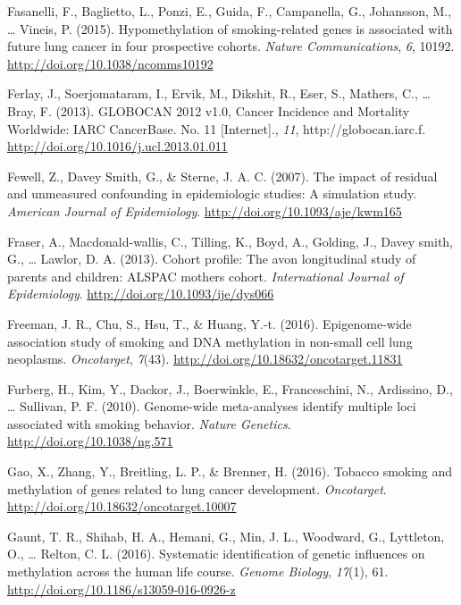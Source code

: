 \documentclass[11pt,twoside]{bristolthesis}
\newlength{\cslhangindent}
\newenvironment{cslreferences}%
  {\setlength{\parindent}{0pt}%
  \everypar{\setlength{\hangindent}{\cslhangindent}}\ignorespaces}%
  {\par}
\begin{document}
\begin{cslreferences}
\leavevmode\hypertarget{ref-Fasanelli2015}{}%
Fasanelli, F., Baglietto, L., Ponzi, E., Guida, F., Campanella, G., Johansson, M., \ldots{} Vineis, P. (2015). Hypomethylation of smoking-related genes is associated with future lung cancer in four prospective cohorts. \emph{Nature Communications}, \emph{6}, 10192. \url{http://doi.org/10.1038/ncomms10192}

\leavevmode\hypertarget{ref-Ferlay2013}{}%
Ferlay, J., Soerjomataram, I., Ervik, M., Dikshit, R., Eser, S., Mathers, C., \ldots{} Bray, F. (2013). GLOBOCAN 2012 v1.0, Cancer Incidence and Mortality Worldwide: IARC CancerBase. No. 11 {[}Internet{]}., \emph{11}, http://globocan.iarc.f. \url{http://doi.org/10.1016/j.ucl.2013.01.011}

\leavevmode\hypertarget{ref-Fewell2007}{}%
Fewell, Z., Davey Smith, G., \& Sterne, J. A. C. (2007). The impact of residual and unmeasured confounding in epidemiologic studies: A simulation study. \emph{American Journal of Epidemiology}. \url{http://doi.org/10.1093/aje/kwm165}

\leavevmode\hypertarget{ref-Fraser2013}{}%
Fraser, A., Macdonald-wallis, C., Tilling, K., Boyd, A., Golding, J., Davey smith, G., \ldots{} Lawlor, D. A. (2013). Cohort profile: The avon longitudinal study of parents and children: ALSPAC mothers cohort. \emph{International Journal of Epidemiology}. \url{http://doi.org/10.1093/ije/dys066}

\leavevmode\hypertarget{ref-Freeman2016}{}%
Freeman, J. R., Chu, S., Hsu, T., \& Huang, Y.-t. (2016). Epigenome-wide association study of smoking and DNA methylation in non-small cell lung neoplasms. \emph{Oncotarget}, \emph{7}(43). \url{http://doi.org/10.18632/oncotarget.11831}

\leavevmode\hypertarget{ref-Furberg2010}{}%
Furberg, H., Kim, Y., Dackor, J., Boerwinkle, E., Franceschini, N., Ardissino, D., \ldots{} Sullivan, P. F. (2010). Genome-wide meta-analyses identify multiple loci associated with smoking behavior. \emph{Nature Genetics}. \url{http://doi.org/10.1038/ng.571}

\leavevmode\hypertarget{ref-Gao2016}{}%
Gao, X., Zhang, Y., Breitling, L. P., \& Brenner, H. (2016). Tobacco smoking and methylation of genes related to lung cancer development. \emph{Oncotarget}. \url{http://doi.org/10.18632/oncotarget.10007}

\leavevmode\hypertarget{ref-Gaunt2016}{}%
Gaunt, T. R., Shihab, H. A., Hemani, G., Min, J. L., Woodward, G., Lyttleton, O., \ldots{} Relton, C. L. (2016). Systematic identification of genetic influences on methylation across the human life course. \emph{Genome Biology}, \emph{17}(1), 61. \url{http://doi.org/10.1186/s13059-016-0926-z}


\end{cslreferences}
\end{document}
